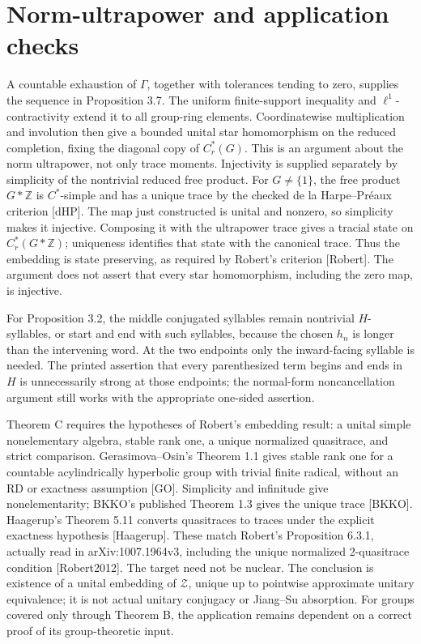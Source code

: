 \documentclass[10pt]{article}
\begin{document}
\section*{Norm-ultrapower and application checks}
A countable exhaustion of \(\Gamma\), together with tolerances tending to zero, supplies the sequence in Proposition 3.7. The uniform finite-support inequality and \(\ell^1\)-contractivity extend it to all group-ring elements. Coordinatewise multiplication and involution then give a bounded unital star homomorphism on the reduced completion, fixing the diagonal copy of \(C_r^*(G)\). This is an argument about the norm ultrapower, not only trace moments. Injectivity is supplied separately by simplicity of the nontrivial reduced free product. For \(G\ne\{1\}\), the free product \(G*\mathbb Z\) is \(C^*\)-simple and has a unique trace by the checked de la Harpe–Préaux criterion [dHP]. The map just constructed is unital and nonzero, so simplicity makes it injective. Composing it with the ultrapower trace gives a tracial state on \(C_r^*(G*\mathbb Z)\); uniqueness identifies that state with the canonical trace. Thus the embedding is state preserving, as required by Robert’s criterion [Robert]. The argument does not assert that every star homomorphism, including the zero map, is injective.\par
For Proposition 3.2, the middle conjugated syllables remain nontrivial \(H\)-syllables, or start and end with such syllables, because the chosen \(h_n\) is longer than the intervening word. At the two endpoints only the inward-facing syllable is needed. The printed assertion that every parenthesized term begins and ends in \(H\) is unnecessarily strong at those endpoints; the normal-form noncancellation argument still works with the appropriate one-sided assertion.\par
Theorem C requires the hypotheses of Robert’s embedding result: a unital simple nonelementary algebra, stable rank one, a unique normalized quasitrace, and strict comparison. Gerasimova–Osin’s Theorem 1.1 gives stable rank one for a countable acylindrically hyperbolic group with trivial finite radical, without an RD or exactness assumption [GO]. Simplicity and infinitude give nonelementarity; BKKO’s published Theorem 1.3 gives the unique trace [BKKO]. Haagerup’s Theorem 5.11 converts quasitraces to traces under the explicit exactness hypothesis [Haagerup]. These match Robert’s Proposition 6.3.1, actually read in arXiv:1007.1964v3, including the unique normalized 2-quasitrace condition [Robert2012]. The target need not be nuclear. The conclusion is existence of a unital embedding of \(\mathcal Z\), unique up to pointwise approximate unitary equivalence; it is not actual unitary conjugacy or Jiang–Su absorption. For groups covered only through Theorem B, the application remains dependent on a correct proof of its group-theoretic input.\par
\end{document}
